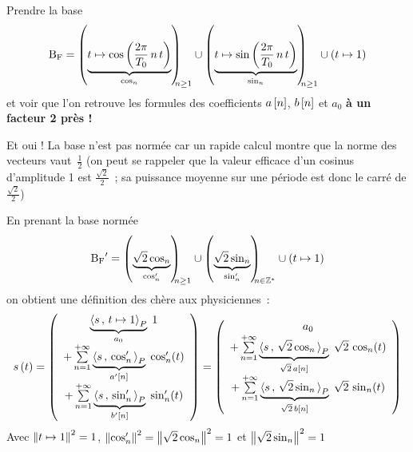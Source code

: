 \begin{exercice}
  Prendre la base  $$\Bf=\p{\caCest{t\mapsto \cos\p{\frac{2 \pi}{T_0}\,n\,t}}{\cos_n}}_{\!\!\!\!n\geq 1}\cup \p{\caCest{t\mapsto \sin\p{\frac{2 \pi}{T_0}\,n\,t}}{\sin_n}}_{\!\!\!\!n\geq 1}\cup \p{t\mapsto 1}$$ et voir que l'on retrouve les formules des coefficients $a\left[n\right]$, $b\left[n\right]$ et $a_0$ \textbf{à un facteur 2 près !}
  
  Et oui ! La base n'est pas normée car un rapide calcul montre que la norme des vecteurs vaut~$\frac{1}{2}$ (on peut se rappeler que la valeur efficace d'un cosinus d'amplitude 1 est $\frac{\sqrt{2}}{2}$~; sa puissance moyenne sur une période est donc le carré de $\frac{\sqrt{2}}{2}$) 

  En prenant la base normée $$\Bf'=\p{\caCest{\sqrt{2}\cos_n}{\cos_n'}}_{\!\!\!\!n\geq 1}\cup \p{\caCest{\sqrt{2}\sin_n}{\sin_n'}}_{\!\!\!\!n\in\Z^*} \cup \p{t\mapsto 1}$$
  on obtient une définition des \sdf{} chère aux physiciennes~:
  \begin{equation}
    \label{eq:sdf_normee}
    s\left(t\right) = \left(
    \begin{array}{c}
      {\underbrace{\langle s\,,\,t\mapsto 1{\rangle}_P}_{a_0}\;1} \\
      + \sum\limits_{n=1}^{+\infty}{\underbrace{\langle s\,,\,\cos_n'{\rangle}_P}_{a'\left[n\right]}\;\cos_n'(t)}  \\
      + \sum\limits_{n=1}^{+\infty}{\underbrace{\langle s\,,\,\sin_n'{\rangle}_P}_{b'\left[n\right]}\;\sin_n'(t)}     
    \end{array}\right)
  = \left(
    \begin{array}{c}
      a_0  \\
      + \sum\limits_{n=1}^{+\infty}{\underbrace{\langle s\,,\,\sqrt{2}\cos_n{\rangle}_P}_{\sqrt{2}\,a\left[n\right]}\;\sqrt{2}\,\cos_n(t)}  \\
      + \sum\limits_{n=1}^{+\infty}{\underbrace{\langle s\,,\,\sqrt{2}\sin_n{\rangle}_P}_{\sqrt{2}\,b\left[n\right]}\;\sqrt{2}\,\sin_n(t)}
    \end{array}\right)
\end{equation}
Avec $\left\|t\mapsto 1\right\|^2=1$, $\left\|\cos_n'\right\|^2=\left\|\sqrt{2}\cos_n\right\|^2=1$ et $\left\|\sqrt{2}\sin_n\right\|^2=1$


\end{exercice}
